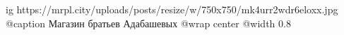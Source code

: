  
 
 
 
 

\ifcmt
  ig https://mrpl.city/uploads/posts/resize/w/750x750/mk4urr2wdr6eloxx.jpg
	@caption Магазин братьев Адабашевых
  @wrap center
  @width 0.8
\fi
